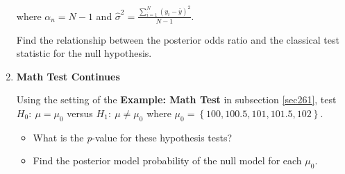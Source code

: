 \begin{enumerate}
	where $\alpha_n = N - 1$ and $\hat{\sigma}^2 = \frac{\sum_{i=1}^N (y_i - \bar{y})^2}{N-1}$.
	
	Find the relationship between the posterior odds ratio and the classical test statistic for the null hypothesis.
	
	\item \textbf{Math Test Continues}
	
	Using the setting of the \textbf{Example: Math Test} in subsection \ref{sec261}, test $H_0: \ \mu = \mu_0$ versus $H_1: \ \mu \neq \mu_0$ where $\mu_0 = \left\{ 100, 100.5, 101, 101.5, 102 \right\}$.
	
	\begin{itemize}
		\item What is the \textit{p}-value for these hypothesis tests?
		\item Find the posterior model probability of the null model for each $\mu_0$.
	\end{itemize}
	
\end{enumerate}





